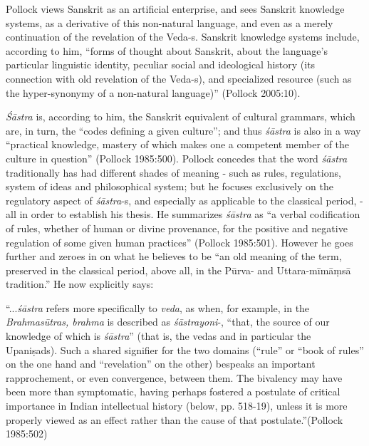 Pollock views Sanskrit as an artificial enterprise, and sees Sanskrit knowledge systems, as a derivative of this non-natural language, and even as a merely continuation of the revelation of the Veda-s. Sanskrit knowledge systems include, according to him,  ``forms of thought about Sanskrit, about the language's particular linguistic identity, peculiar social and ideological history (its connection with old revelation of the Veda-s), and specialized resource (such as the hyper-synonymy of a non-natural language)'' (Pollock 2005:10). 

{\sl Śāstra} is, according to him, the Sanskrit equivalent of cultural grammars, which are, in turn, the ``codes defining a given culture''; and thus {\sl śāstra} is also in a way ``practical knowledge, mastery of which makes one a competent member of the culture in question'' (Pollock 1985:500). Pollock concedes that the word {\sl śāstra} traditionally has had different shades of meaning - such as rules, regulations, system of ideas and philosophical system; but he focuses exclusively on the regulatory aspect of {\sl śāstra}-s, and especially as applicable to the classical period, - all in order to establish his thesis. He summarizes {\sl śāstra} as ``a verbal codification of rules, whether of human or divine provenance, for the positive and negative regulation of some given human practices'' (Pollock 1985:501). However he goes further and zeroes in on what he believes to be ``an old meaning of the term, preserved in the classical period, above all, in the Pūrva- and Uttara-mīmāṃsā tradition.'' He now explicitly says: 
\begin{myquote}
``...{\sl śāstra} refers more specifically to {\sl veda}, as when, for example, in the {\sl Brahmasūtras, brahma} is described as {\sl śāstrayoni}-, ``that, the source of our knowledge of which is {\sl śāstra}'' (that is, the vedas and in particular the Upaniṣads). Such a shared signifier for the two domains (``rule'' or ``book of rules'' on the one hand and ``revelation'' on the other) bespeaks an important rapprochement, or even convergence, between them. The bivalency may have been more than symptomatic, having perhaps fostered a postulate of critical importance in Indian intellectual history (below, pp. 518-19), unless it is more properly viewed as an effect rather than the cause of that postulate.”\hfill 	(Pollock 1985:502)
\end{myquote}


